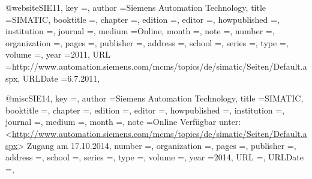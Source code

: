 @website{SIE11,
	key					={},
	author				={{Siemens Automation Technology}},
	title				={SIMATIC},
	booktitle			={},
	chapter				={},
	edition				={},
	editor				={},
	howpublished		={},
	institution			={},
	journal				={},
	medium				={Online},
	month				={},
	note				={},
	number				={},
	organization		={},
	pages				={},
	publisher			={},
	address				={},
	school				={},
	series				={},
	type				={},
	volume				={},
	year				={2011},
	URL	  				={http://www.automation.siemens.com/mcms/topics/de/simatic/Seiten/Default.aspx},
	URLDate				={6.7.2011},
}

@misc{SIE14,
	key					={},
	author				={{Siemens Automation Technology}},
	title				={SIMATIC},
	booktitle			={},
	chapter				={},
	edition				={},
	editor				={},
	howpublished		={},
	institution			={},
	journal				={},
	medium				={},
	month				={},
	note				={{\lbrack}Online{\rbrack} Verfügbar unter: <\url{http://www.automation.siemens.com/mcms/topics/de/simatic/Seiten/Default.aspx}> {\lbrack}Zugang am 17.10.2014{\rbrack}},
	number				={},
	organization		={},
	pages				={},
	publisher			={},
	address				={},
	school				={},
	series				={},
	type				={},
	volume				={},
	year				={2014},
	URL	  				={},
	URLDate				={},
}


